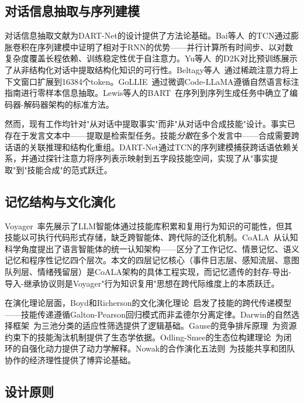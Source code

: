 \documentclass[12pt,a4paper]{ctexart}
\begin{document}
\subsection{对话信息抽取与序列建模}

对话信息抽取文献为DART-Net的设计提供了方法论基础。Bai等人~\cite{bai2018tcn}的TCN通过膨胀卷积在序列建模中证明了相对于RNN的优势——并行计算所有时间步、以对数复杂度覆盖长程依赖、训练稳定性优于自注意力。Yu等人~\cite{yu2022d2k}的D2K对比预训练展示了从非结构化对话中提取结构化知识的可行性。Beltagy等人~\cite{beltagy2020longformer}通过稀疏注意力将上下文窗口扩展到16384个token。GoLLIE~\cite{sainz2023gollie}通过微调Code-LLaMA遵循自然语言标注指南进行零样本信息抽取。Lewis等人的BART~\cite{lewis2019bart}在序列到序列生成任务中确立了编码器-解码器架构的标准方法。

然而，现有工作均针对"从对话中提取事实"而非"从对话中合成技能"设计。事实已存在于发言文本中——提取是检索型任务。技能\emph{分散}在多个发言中——合成需要跨话语的关联推理和结构化重组。DART-Net通过TCN的序列建模捕获跨话语依赖关系，并通过探针注意力将序列表示映射到五字段技能空间，实现了从"事实提取"到"技能合成"的范式跃迁。

\subsection{记忆结构与文化演化}

Voyager~\cite{wang2023voyager}率先展示了LLM智能体通过技能库积累和复用行为知识的可能性，但其技能以可执行代码形式存储，缺乏跨智能体、跨代际的泛化机制。CoALA~\cite{sumers2023coala}从认知科学角度提出了语言智能体的统一认知架构——区分了工作记忆、情景记忆、语义记忆和程序性记忆四个层次。本文的四层记忆核心（事件日志层、感知流层、意图队列层、情绪残留层）是CoALA架构的具体工程实现，而记忆遗传的封存-导出-导入-继承协议则是Voyager"行为知识复用"思想在跨代际维度上的本质跃迁。

在演化理论层面，Boyd和Richerson的文化演化理论~\cite{boyd1985culture}启发了技能的跨代传递模型——技能传递遵循Galton-Pearson回归模式而非孟德尔分离定律。Darwin的自然选择框架~\cite{darwin1859}为三池分类的适应性筛选提供了逻辑基础。Gause的竞争排斥原理~\cite{gause1934struggle}为资源约束下的技能淘汰机制提供了生态学依据。Odling-Smee的生态位构建理论~\cite{odling2003niche}为闭环的自强化动力提供了动力学解释。Nowak的合作演化五法则~\cite{nowak2006five}为技能共享和团队协作的经济理性提供了博弈论基础。

\subsection{设计原则}
\end{document}
